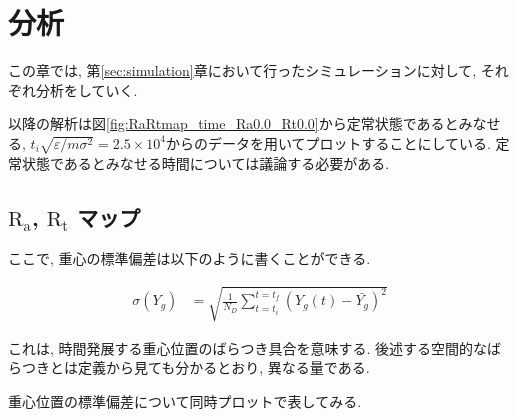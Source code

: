 \chapter{分析}

この章では, 第\ref{sec:simulation}章において行ったシミュレーションに対して, それぞれ分析をしていく.

以降の解析は図\ref{fig:RaRtmap_time_Ra0.0_Rt0.0}から定常状態であるとみなせる, $t_i \sqrt{\varepsilon / m \sigma^2} = 2.5 \times 10^{4}$からのデータを用いてプロットすることにしている. 定常状態であるとみなせる時間については議論する必要がある.

\section{$\text{R}_\text{a}$, $\text{R}_\text{t}$ マップ}


ここで, 重心の標準偏差は以下のように書くことができる.

\begin{align}
  \sigma (Y_g) &= \sqrt{\frac{1}{N_{D}}\sum_{t=t_i}^{t=t_f} (Y_{g}(t) - \bar{Y_g})^2}
\end{align}

これは, 時間発展する重心位置のばらつき具合を意味する. 後述する空間的なばらつきとは定義から見ても分かるとおり, 異なる量である.

重心位置の標準偏差について同時プロットで表してみる. 

